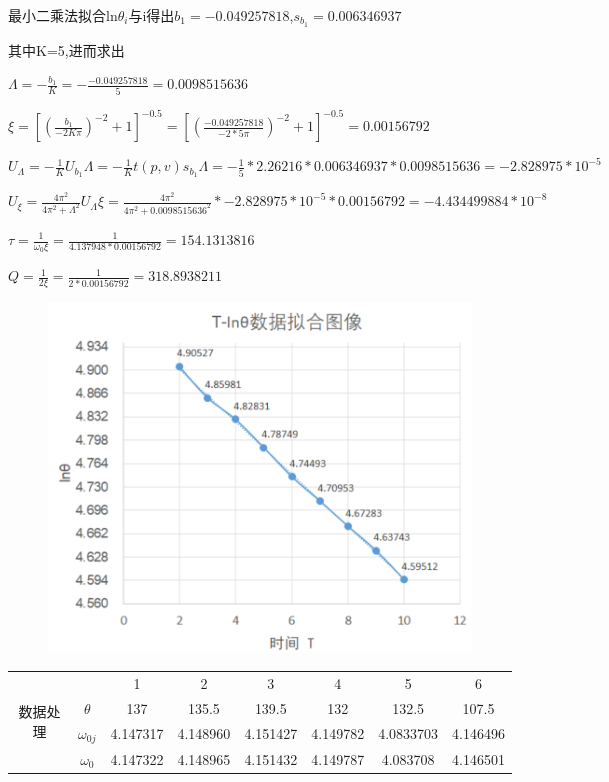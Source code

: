 \documentclass[UTF8]{ctexart}
\begin{document}
        最小二乘法拟合ln$\theta_{i}$与i得出$b_{1}=-0.049257818$,\quad $s_{b_{1}}=0.006346937$

        其中K=5,进而求出

        $\Lambda=-\frac{b_{1}}{K}=-\frac{-0.049257818}{5}=0.0098515636$

        $\xi=[(\frac{b_{1}}{-2K\pi})^{-2}+1]^{-0.5}=[(\frac{-0.049257818}{-2*5\pi})^{-2}+1]^{-0.5}=0.00156792$

        $U_{\Lambda}=-\frac{1}{K}U_{b_{1}}\Lambda=-\frac{1}{K}t(p,v)s_{b_{1}}\Lambda=-\frac{1}{5}*2.26216*0.006346937*0.0098515636=-2.828975*10^{-5}$

        $U_{\xi}=\frac{4\pi^{2}}{4\pi^{2}+\Lambda^2}U_{\Lambda}\xi=\frac{4\pi^{2}}{4\pi^{2}+0.0098515636^{2}}*-2.828975*10^{-5}*0.00156792=-4.434499884*10^{-8}$

        $\tau=\frac{1}{\omega_{0}\xi}=\frac{1}{4.137948*0.00156792}=154.1313816$

        $Q=\frac{1}{2\xi}=\frac{1}{2*0.00156792}=318.8938211$
        \begin{figure}[ht]
            \centering
            \includegraphics[scale=0.6]{second.png}
        \end{figure}
        \begin{table}[!htbp]
            \centering
            \begin{tabular}{|c|c|c|c|c|c|c|c|}
            \hline
            \multirow{4}{*}{数据处理} &               & 1        & 2        & 3        & 4        & 5         & 6        \\ \cline{2-8}
                                  & $\theta$      & 137      & 135.5    & 139.5    & 132      & 132.5     & 107.5    \\ \cline{2-8}
                                  & $\omega_{0j}$ & 4.147317 & 4.148960 & 4.151427 & 4.149782 & 4.0833703 & 4.146496 \\ \cline{2-8}
                                  & $\omega_{0}$  & 4.147322 & 4.148965 & 4.151432 & 4.149787 & 4.083708  & 4.146501 \\ \hline
            \end{tabular}
        \end{table}
\end{document}
